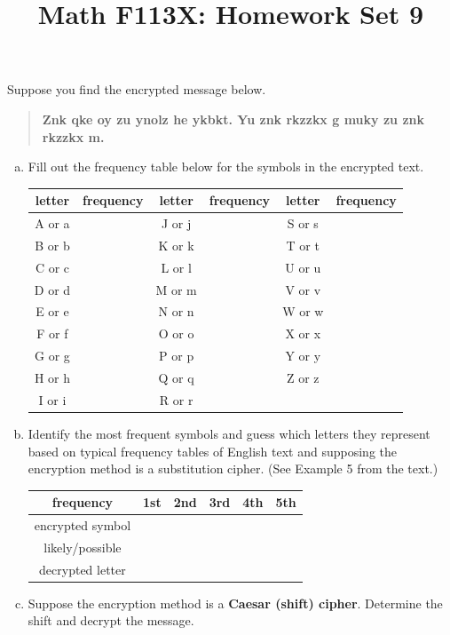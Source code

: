 \documentclass[11pt, oneside]{article}   	%
\title{Math F113X: Homework Set 9}
\date{}							%
\begin{document}
\maketitle

\vspace{-1.5cm}



\vfill

 Suppose you find the encrypted message below. 
\begin{quote} \textbf{Znk qke oy zu ynolz he ykbkt. Yu znk rkzzkx g muky zu znk rkzzkx m.} \end{quote}
	\begin{enumerate}[(a)]
	\item Fill out the frequency table below for the symbols in the encrypted text.\\
	\begin{tabular}{c|c||c|c||c|c}
	letter&frequency&letter&frequency&letter&frequency\\
	\hline \hline
	A or a&&J or j&&S or s&\\
	\hline
	B or b&&K or k&&T or t&\\
	\hline
	C or c&&L or l&&U or u&\\
	\hline
	D or d&&M or m&&V or v&\\
	\hline
	E or e&&N or n&&W or w&\\
	\hline
	F or f&&O or o&&X or x&\\
	\hline
	G or g&&P or p&&Y or y&\\
	\hline
	H or h&&Q or q&&Z or z&\\
	\hline
	I or i&&R or r&&&\\
	\hline
	\end{tabular}
	\item  Identify the most frequent symbols and guess which letters they represent based on typical frequency tables of English text and supposing the encryption method is a substitution cipher. (See Example 5 from the text.) \\
	\begin{tabular}{c||c|c|c|c|c}
	frequency&1st&2nd&3rd&4th&5th\\
	\hline
	encrypted symbol&&&&&\\
	\hline
	likely/possible&&&&&\\
	decrypted letter&&&&&\\
	\end{tabular}
	\item  Suppose the encryption method is a \textbf{Caesar (shift) cipher}. Determine the shift and decrypt the message.
	
	\end{enumerate}
	
\end{document}
